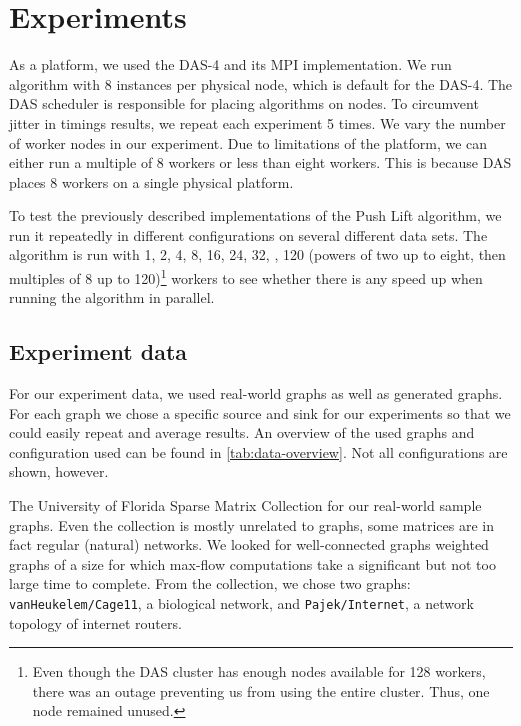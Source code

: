 \chapter{Experiments}
\label{chp:experiments}

As a platform, we used the DAS-4 and its MPI implementation. We run algorithm with 8 instances per physical node, which is default for the DAS-4.
The DAS scheduler is responsible for placing algorithms on nodes. To circumvent jitter in timings results, we repeat each experiment 5 times. We vary the number of worker nodes in our experiment. Due to limitations of the platform, we can either run a multiple of 8 workers or less than eight workers. This is because DAS places 8 workers on a single physical platform.

To test the previously described implementations of the Push Lift algorithm, we run it repeatedly in different configurations on several different data sets. The algorithm is run with 1, 2, 4, 8, 16, 24, 32, \textellipsis, 120 (powers of two up to eight, then multiples of 8 up to 120)\footnote{Even though the DAS cluster has enough nodes available for 128 workers, there was an outage preventing us from using the entire cluster. Thus, one node remained unused.} workers to see whether there is any speed up when running the algorithm in parallel.

\section{Experiment data}
For our experiment data, we used real-world graphs as well as generated graphs. For each graph we chose a specific source and sink for our experiments so that we could easily repeat and average results. An overview of the used graphs and configuration used can be found in \autoref{tab:data-overview}. Not all configurations are shown, however.

The University of Florida Sparse Matrix Collection \cite{FloridaSparseMatrix} for our real-world sample graphs. Even the collection is mostly unrelated to graphs, some matrices are in fact regular (natural) networks. We looked for well-connected graphs weighted graphs of a size for which max-flow computations take a significant but not too large time to complete. From the collection, we chose two graphs: \texttt{vanHeukelem/Cage11}, a biological network, and \texttt{Pajek/Internet}, a network topology of internet routers.

